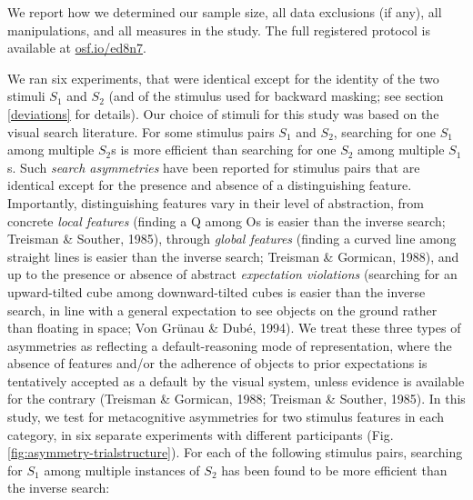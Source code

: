 \documentclass[12pt,twoside]{reedthesis}
\begin{document}
We report how we determined our sample size, all data exclusions (if any), all manipulations, and all measures in the study. The full registered protocol is available at \url{osf.io/ed8n7}.

We ran six experiments, that were identical except for the identity of the two stimuli \(S_1\) and \(S_2\) (and of the stimulus used for backward masking; see section \ref{deviations} for details). Our choice of stimuli for this study was based on the visual search literature. For some stimulus pairs \(S_1\) and \(S_2\), searching for one \(S_1\) among multiple \(S_2\)s is more efficient than searching for one \(S_2\) among multiple \(S_1\)s. Such \emph{search asymmetries} have been reported for stimulus pairs that are identical except for the presence and absence of a distinguishing feature. Importantly, distinguishing features vary in their level of abstraction, from concrete \emph{local features} (finding a Q among Os is easier than the inverse search; Treisman \& Souther, 1985), through \emph{global features} (finding a curved line among straight lines is easier than the inverse search; Treisman \& Gormican, 1988), and up to the presence or absence of abstract \emph{expectation violations} (searching for an upward-tilted cube among downward-tilted cubes is easier than the inverse search, in line with a general expectation to see objects on the ground rather than floating in space; Von Grünau \& Dubé, 1994). We treat these three types of asymmetries as reflecting a default-reasoning mode of representation, where the absence of features and/or the adherence of objects to prior expectations is tentatively accepted as a default by the visual system, unless evidence is available for the contrary (Treisman \& Gormican, 1988; Treisman \& Souther, 1985). In this study, we test for metacognitive asymmetries for two stimulus features in each category, in six separate experiments with different participants (Fig. \ref{fig:asymmetry-trialstructure}). For each of the following stimulus pairs, searching for \(S_1\) among multiple instances of \(S_2\) has been found to be more efficient than the inverse search:
\end{document}
